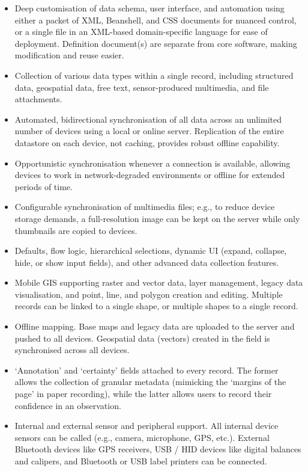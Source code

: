 \documentclass[preprint,12pt, a4paper]{elsarticle}
\begin{document}
\begin{itemize}
\item Deep customisation of data schema, user interface, and automation using either a packet of XML, Beanshell, and CSS documents for nuanced control, or a single file in an XML-based domain-specific language for ease of deployment. Definition document(s) are separate from core software, making modification and reuse easier.
\item Collection of various data types within a single record, including structured data, geospatial data, free text, sensor-produced multimedia, and file attachments.
\item Automated, bidirectional synchronisation of all data across an unlimited number of devices using a local or online server. Replication of the entire datastore on each device, not caching, provides robust offline capability. 
\item Opportunistic synchronisation whenever a connection is available, allowing devices to work in network-degraded environments or offline for extended periods of time. 
\item Configurable synchronisation of multimedia files; e.g., to reduce device storage demands, a full-resolution image can be kept on the server while only thumbnails are copied to devices.
\item Defaults, flow logic, hierarchical selections, dynamic UI (expand, collapse, hide, or show input fields), and other advanced data collection features.
\item Mobile GIS supporting raster and vector data, layer management, legacy data visualisation, and point, line, and polygon creation and editing. Multiple records can be linked to a single shape, or multiple shapes to a single record.
\item Offline mapping. Base maps and legacy data are uploaded to the server and pushed to all devices. Geospatial data (vectors) created in the field is synchronised across all devices. 
\item `Annotation' and `certainty' fields attached to every record. The former allows the collection of granular metadata (mimicking the `margins of the page' in paper recording), while the latter allows users to record their confidence in an observation. 
\item Internal and external sensor and peripheral support. All internal device sensors can be called (e.g., camera, microphone, GPS, etc.). External Bluetooth devices like GPS receivers, USB / HID devices like digital balances and calipers, and Bluetooth or USB label printers can be connected.

\end{itemize}
\end{document}
